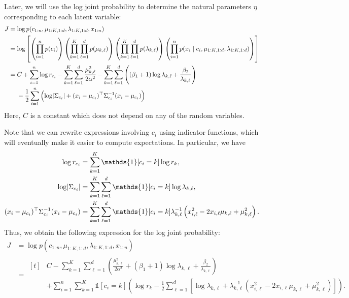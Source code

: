 \documentclass[11pt]{article}
\begin{document}
Later, we will use the log joint probability to determine the natural parameters $\eta$ corresponding to each latent variable:
\begin{align}
J
&= \log p(c_{1:n}, \mu_{1:K,1:d}, \lambda_{1:K,1:d}, x_{1:n}) \\
&= \log \left[
        \left( \prod_{i=1}^n p(c_i) \right)
        \left( \prod_{k=1}^K \prod_{\ell=1}^d p(\mu_{k, \ell}) \right)
        \left( \prod_{k=1}^K \prod_{\ell=1}^d p(\lambda_{k, \ell}) \right)
        \left( \prod_{i=1}^n p(x_i \mid c_i, \mu_{1:K,1:d}, \lambda_{1:K,1:d}) \right)
    \right] \\
&= \begin{aligned}[t]
    &C + \sum_{i=1}^n \log r_{c_i}
    - \sum_{k=1}^K \sum_{\ell=1}^d \frac{\mu_{k, \ell}^2}{2\alpha^2}
    - \sum_{k=1}^K \sum_{\ell=1}^d \left( (\beta_1 + 1) \log \lambda_{k,\ell} + \frac{\beta_2}{\lambda_{k,\ell}} \right) \\
    &- \frac{1}{2} \sum_{i=1}^n \left( \log \abs{ \Sigma_{c_i} } + (x_i - \mu_{c_i})^\top \Sigma_{c_i}^{-1} (x_i - \mu_{c_i}) \right)
    \end{aligned}
\end{align}
Here, $C$ is a constant which does not depend on any of the random variables.

Note that we can rewrite expressions involving $c_i$ using indicator functions, which will eventually make it easier to compute expectations.
In particular, we have
\begin{align}
\log r_{c_i}
&= \sum_{k=1}^K \mathds{1}[c_i = k] \log r_k, \\
\log \abs{\Sigma_{c_i}}
&= \sum_{k=1}^K \sum_{\ell=1}^d \mathds{1}[c_i = k] \log \lambda_{k,\ell}, \\
(x_i - \mu_{c_i})^\top \Sigma_{c_i}^{-1} (x_i - \mu_{c_i})
&= \sum_{k=1}^K \sum_{\ell=1}^d \mathds{1}[c_i = k] \lambda_{k,\ell}^{-1} \left( x_{i,\ell}^2 - 2 x_{i,\ell} \mu_{k,\ell} + \mu_{k,\ell}^2 \right).
\end{align}
Thus, we obtain the following expression for the log joint probability:
\begin{align}
J
&= \log p(c_{1:n}, \mu_{1:K,1:d}, \lambda_{1:K,1:d}, x_{1:n}) \\
\label{eq:logJointExample}
&= \begin{aligned}[t]
    & C - \sum_{k=1}^K \sum_{\ell=1}^d \left( \frac{\mu_{k, \ell}^2}{2\alpha^2} + (\beta_1 + 1) \log \lambda_{k,\ell} + \frac{\beta_2}{\lambda_{k,\ell}} \right) \\
    & + \sum_{i=1}^n \sum_{k=1}^K \mathds{1}[c_i = k] \left( \log r_k - \frac{1}{2}
        \sum_{\ell=1}^d \left[ \log \lambda_{k,\ell} + \lambda_{k,\ell}^{-1} \left( x_{i,\ell}^2 - 2 x_{i,\ell} \mu_{k,\ell} + \mu_{k,\ell}^2 \right) \right]
    \right).
    \end{aligned}
\end{align}
\end{document}
